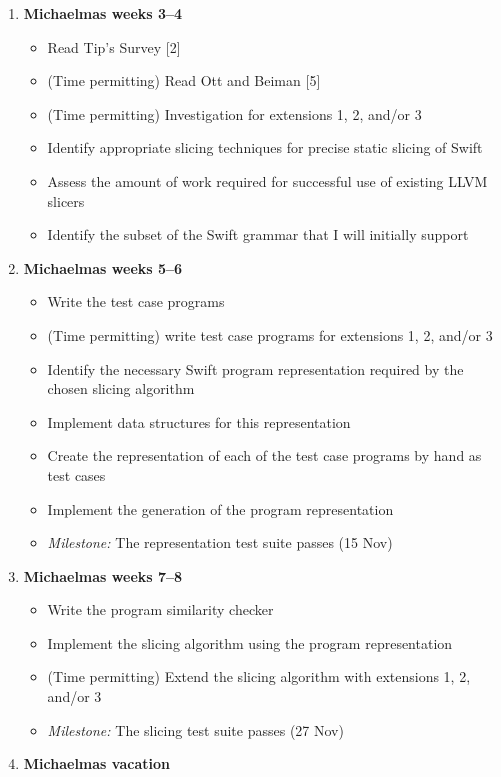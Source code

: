 \begin{enumerate}
\def\labelenumi{\arabic{enumi}.}
\tightlist
\item
  \textbf{Michaelmas weeks 3--4}

  \begin{itemize}
  \tightlist
  \item
    Read Tip's Survey {[}2{]}
  \item
    (Time permitting) Read Ott and Beiman {[}5{]}
  \item
    (Time permitting) Investigation for extensions 1, 2, and/or 3
  \item
    Identify appropriate slicing techniques for precise static slicing
    of Swift
  \item
    Assess the amount of work required for successful use of existing
    LLVM slicers
  \item
    Identify the subset of the Swift grammar that I will initially
    support
  \end{itemize}
\item
  \textbf{Michaelmas weeks 5--6}

  \begin{itemize}
  \tightlist
  \item
    Write the test case programs
  \item
    (Time permitting) write test case programs for extensions 1, 2,
    and/or 3
  \item
    Identify the necessary Swift program representation required by the
    chosen slicing algorithm
  \item
    Implement data structures for this representation
  \item
    Create the representation of each of the test case programs by hand
    as test cases
  \item
    Implement the generation of the program representation
  \item
    \emph{Milestone:} The representation test suite passes (15 Nov)
  \end{itemize}
\item
  \textbf{Michaelmas weeks 7--8}

  \begin{itemize}
  \tightlist
  \item
    Write the program similarity checker
  \item
    Implement the slicing algorithm using the program representation
  \item
    (Time permitting) Extend the slicing algorithm with extensions 1, 2,
    and/or 3
  \item
    \emph{Milestone:} The slicing test suite passes (27 Nov)
  \end{itemize}
\item
  \textbf{Michaelmas vacation}


\end{enumerate}
